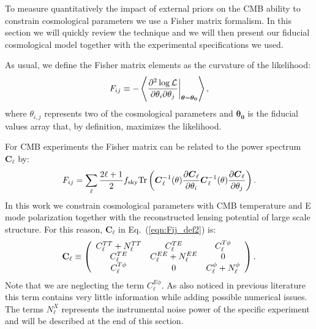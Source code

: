\documentclass[aps,prd,reprint,superscriptaddress]{revtex4-1}
\newcommand\refeq[1]{Eq.~(\ref{eqn:#1})}
\begin{document}
To measure quantitatively the impact of external priors on the CMB ability to constrain cosmological parameters we use a Fisher matrix formalism. In this section we will quickly review  the technique and we will then present our fiducial cosmological model together with the experimental specifications we used.

As usual, we define the Fisher matrix elements as the curvature of the likelihood:
\begin{equation}
	\centering
		F_{ij} \equiv - \left\langle\frac{\partial^2 \log \mathcal{L}}{\partial \theta_i \partial \theta_j} \bigg|_{\boldsymbol{\theta} = \boldsymbol{\theta_0}}\right\rangle,
	\label{eqn:Fij_def}
\end{equation}
where $\theta_{i,j}$ represents two of the cosmological parameters and $\boldsymbol{\theta_0}$ is the fiducial values array that, by definition, maximizes the likelihood. 

For CMB experiments the Fisher matrix can be related to the power spectrum $\boldsymbol{C}_\ell$ by:
\begin{equation}
 F_{ij} = \sum_\ell \frac{2\ell+1}{2} f_{\rm sky} {\rm Tr} \left(  \boldsymbol{C}^{-1}_\ell( \theta) \frac{\partial \boldsymbol{C}_\ell}{\partial \theta_i} \boldsymbol{C}^{-1}_\ell( \theta) \frac{\partial \boldsymbol{C}_\ell}{\partial \theta_j}  \right).
 \label{eqn:Fij_def2}
 \end{equation}
In this work we constrain cosmological parameters with CMB temperature and E mode polarization together with the reconstructed lensing potential of large scale structure. For this reason, $\boldsymbol{C}_\ell$ in \refeq{Fij_def2} is:
 \begin{eqnarray}
 	\centering
		\mathbf{C}_\ell \equiv \left( \begin{array}{ccc}C_\ell^{TT} + N_\ell^{TT} & C_\ell^{TE} & C_\ell^{T\phi} \\ C_\ell^{TE} & C_\ell^{EE} + N_\ell^{EE} & 0 \\ C_\ell^{T\phi} & 0 & C_\ell^{\phi} + N_\ell^{\phi}\end{array}\right).
	\label{eqn:cov_definition}
\end{eqnarray}
Note that we are neglecting the term $C_\ell^{E\phi}$. As also noticed in previous literature \cite{wu:2014,2013PhRvD..87h3008H} this term contains very little information while adding possible numerical issues.
The terms $N_\ell^{X}$ represents the instrumental noise power of the specific experiment and will be described at the end of this section.
\end{document}
